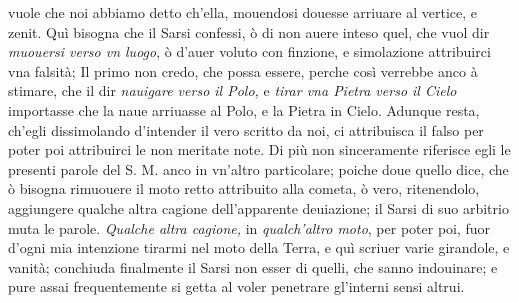 \documentclass[11pt,twoside,openany]{book}
\begin{document}
vuole che noi abbiamo detto ch'ella, mouendosi douesse arriuare al vertice, e zenit. Quì bisogna che il Sarsi confessi, ò di non auere inteso quel, che vuol dir \textit{muouersi verso vn luogo}, ò d'auer voluto con finzione, e simolazione attribuirci vna falsità; Il primo non credo, che possa essere, perche così verrebbe anco à stimare, che il dir \textit{nauigare verso il Polo,} e \textit{tirar vna Pietra verso il Cielo} importasse che la naue arriuasse al Polo, e la Pietra in Cielo. Adunque resta, ch'egli dissimolando d'intender il vero scritto da noi, ci attribuisca il falso per poter poi attribuirci le non meritate note. Di più non sinceramente riferisce egli le presenti parole del S. M. anco in vn'altro particolare; poiche doue quello dice, che ò bisogna rimuouere il moto retto attribuito alla cometa, ò vero, ritenendolo, aggiungere qualche altra cagione dell'apparente deuiazione; il Sarsi di suo arbitrio muta le parole. \textit{Qualche altra cagione,} in \textit{qualch'altro moto}, per poter poi, fuor d'ogni mia intenzione tirarmi nel moto della Terra, e quì scriuer varie girandole, e vanità; conchiuda finalmente il Sarsi non esser di quelli, che sanno indouinare; e pure assai frequentemente si getta al voler penetrare gl'interni sensi altrui.
\end{document}
